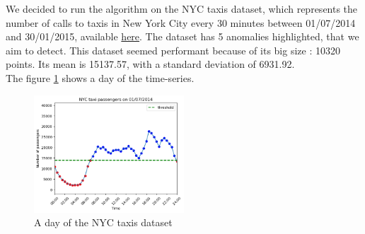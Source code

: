 \documentclass[11pt]{article}
\begin{document}
We decided to run the algorithm on the NYC taxis dataset, which represents the number of calls to taxis in New York City every 30 minutes between 01/07/2014 and 30/01/2015, available \href{https://github.com/numenta/NAB/blob/master/data/realKnownCause/nyc_taxi.csv}{here}. 
The dataset has 5 anomalies highlighted, that we aim to detect. 
This dataset seemed performant because of its big size : 10320 points. 
Its mean is 15137.57, with a standard deviation of 6931.92. \\
The figure \ref{fig:taxis} shows a day of the time-series.
\begin{figure}[h]
    \centering
    \includegraphics[width=0.5\textwidth]{example_day.png}
    \caption{A day of the NYC taxis dataset}
    \label{fig:taxis}
\end{figure}
\end{document}
